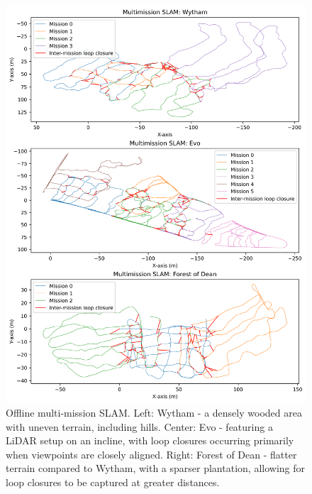 
\begin{figure}[t]
  \centering
  \includegraphics[width=0.99\columnwidth]{pics/exp_3_1_multimission_slam_big}
  \caption{Offline multi-mission SLAM. Left: Wytham - a densely wooded area with uneven terrain, including hills. Center: Evo - featuring a LiDAR setup on an incline, with loop closures occurring primarily when viewpoints are closely aligned. Right: Forest of Dean - flatter terrain compared to Wytham, with a sparser plantation, allowing for loop closures to be captured at greater distances. 
}
  \label{fig:exp_multi_mission}
\end{figure}

